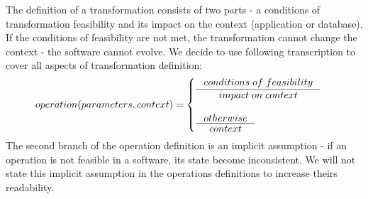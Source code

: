 \documentclass[11pt]{article}
\begin{document}
The definition of a transformation consists of two parts - a conditions of transformation feasibility and its impact on the context (application or database). If the conditions of feasibility are not met, the transformation cannot change the context - the software cannot evolve.  We decide to use following transcription to cover all aspects of transformation definition:
\begin{gather*}
operation(parameters, context) = \begin{cases}
  \inference{conditions \; of \; feasibility}{impact \; on \; context}\\ \\
  \inference{otherwise}{context}
 \end{cases}
\end{gather*}
The second branch of the operation definition is an implicit assumption - if an operation is not feasible in a software, its state become inconsistent. We will not state this implicit assumption in the operations definitions to increase theirs readability.
\end{document}
